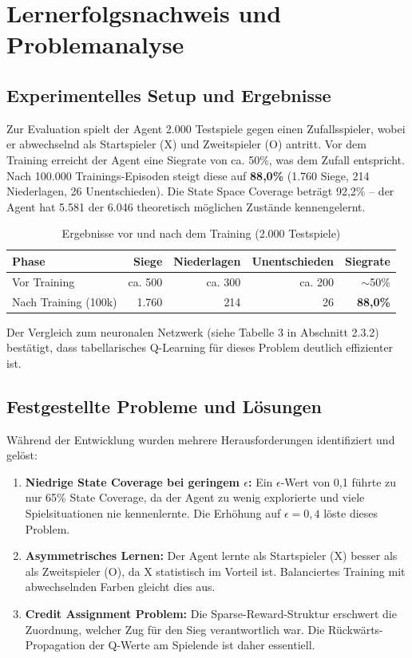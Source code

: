 \section{Lernerfolgsnachweis und Problemanalyse}

\subsection{Experimentelles Setup und Ergebnisse}

Zur Evaluation spielt der Agent 2.000 Testspiele gegen einen Zufallsspieler, wobei er abwechselnd als Startspieler (X) und Zweitspieler (O) antritt. Vor dem Training erreicht der Agent eine Siegrate von ca. 50\%, was dem Zufall entspricht. Nach 100.000 Trainings-Episoden steigt diese auf \textbf{88,0\%} (1.760 Siege, 214 Niederlagen, 26 Unentschieden). Die State Space Coverage beträgt 92,2\% -- der Agent hat 5.581 der 6.046 theoretisch möglichen Zustände kennengelernt.

\begin{table}[H]
\centering
\begin{tabular}{l|r|r|r|r}
\textbf{Phase} & \textbf{Siege} & \textbf{Niederlagen} & \textbf{Unentschieden} & \textbf{Siegrate} \\
\hline
Vor Training & ca. 500 & ca. 300 & ca. 200 & $\sim$50\% \\
Nach Training (100k) & 1.760 & 214 & 26 & \textbf{88,0\%} \\
\end{tabular}
\caption{Ergebnisse vor und nach dem Training (2.000 Testspiele)}
\end{table}

Der Vergleich zum neuronalen Netzwerk (siehe Tabelle 3 in Abschnitt 2.3.2) bestätigt, dass tabellarisches Q-Learning für dieses Problem deutlich effizienter ist.

\subsection{Festgestellte Probleme und Lösungen}

Während der Entwicklung wurden mehrere Herausforderungen identifiziert und gelöst:

\begin{enumerate}
    \item \textbf{Niedrige State Coverage bei geringem $\epsilon$:} Ein $\epsilon$-Wert von 0,1 führte zu nur 65\% State Coverage, da der Agent zu wenig explorierte und viele Spielsituationen nie kennenlernte. Die Erhöhung auf $\epsilon = 0,4$ löste dieses Problem.
    
    \item \textbf{Asymmetrisches Lernen:} Der Agent lernte als Startspieler (X) besser als als Zweitspieler (O), da X statistisch im Vorteil ist. Balanciertes Training mit abwechselnden Farben gleicht dies aus.
    
    \item \textbf{Credit Assignment Problem:} Die Sparse-Reward-Struktur erschwert die Zuordnung, welcher Zug für den Sieg verantwortlich war. Die Rückwärts-Propagation der Q-Werte am Spielende ist daher essentiell.
\end{enumerate}